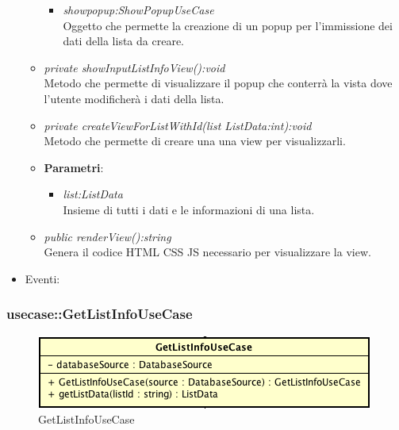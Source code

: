 \begin{itemize}
\begin{itemize}
{\begin{itemize}
				Oggetto dedicato alla gestione dei dati relativi alla lista all'interno del database.
			\item \textit{showpopup:ShowPopupUseCase}\\
				Oggetto che permette la creazione di un popup per l'immissione dei dati della lista da creare.	
			\end{itemize}}
	\item \textit{private showInputListInfoView():void}\\
		Metodo che permette di visualizzare il popup che conterrà la vista dove l'utente modificherà i dati della lista.
	\item \textit{private createViewForListWithId(list ListData:int):void}\\
		Metodo che permette di creare una una view per visualizzarli.
			\item{\textbf{Parametri}: \begin{itemize}
			\item \textit{list:ListData}\\
			Insieme di tutti i dati e le informazioni di una lista.
			\end{itemize}}
	\item \textit{public renderView():string}\\
	Genera il codice HTML CSS JS necessario per visualizzare la view.
	\end{itemize} 
\item{Eventi}:
\end{itemize}

\subsubsection{usecase::GetListInfoUseCase}

\label{GetListInfoUseCase}
\begin{figure}[ht]
	\centering
	\includegraphics[scale=0.5]{Sezioni/SottosezioniST/img/app/GetListInfoUseCase.png}
	\caption{GetListInfoUseCase}
\end{figure}

